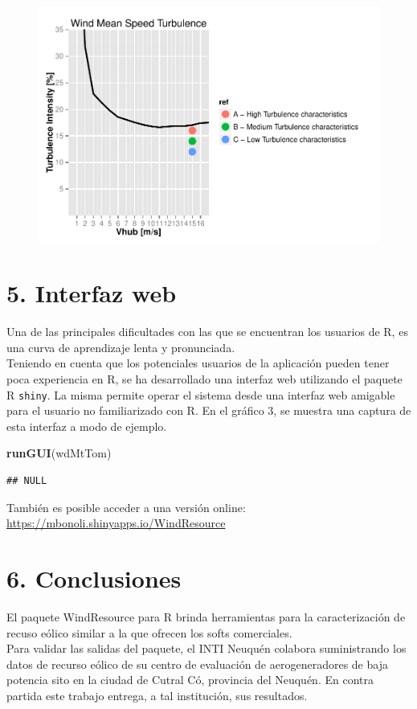 \documentclass[]{article}
\newenvironment{Shaded}{\begin{snugshade}}{\end{snugshade}}
\newcommand{\KeywordTok}[1]{\textcolor[rgb]{0.13,0.29,0.53}{\textbf{{#1}}}}
\newcommand{\NormalTok}[1]{{#1}}
\begin{document}
\begin{figure}[htbp]
\centering
\includegraphics{Manual_WindResource_files/figure-latex/unnamed-chunk-24-1.pdf}
\caption{}
\end{figure}

\section{5. Interfaz web}\label{interfaz-web}

Una de las principales dificultades con las que se encuentran los
usuarios de R, es una curva de aprendizaje lenta y
pronunciada.\\Teniendo en cuenta que los potenciales usuarios de la
aplicación pueden tener poca experiencia en R, se ha desarrollado una
interfaz web utilizando el paquete R \texttt{shiny}. La misma permite
operar el sistema desde una interfaz web amigable para el usuario no
familiarizado con R. En el gráfico 3, se muestra una captura de esta
interfaz a modo de ejemplo.

\begin{Shaded}
\begin{Highlighting}[]
\KeywordTok{runGUI}\NormalTok{(wdMtTom)}
\end{Highlighting}
\end{Shaded}

\begin{verbatim}
## NULL
\end{verbatim}

También es posible acceder a una versión online:
\url{https://mbonoli.shinyapps.io/WindResource}

\section{6. Conclusiones}\label{conclusiones}

El paquete WindResource para R brinda herramientas para la
caracterización de recuso eólico similar a la que ofrecen los softs
comerciales.\\Para validar las salidas del paquete, el INTI Neuquén
colabora suministrando los datos de recurso eólico de su centro de
evaluación de aerogeneradores de baja potencia sito en la ciudad de
Cutral Có, provincia del Neuquén. En contra partida este trabajo
entrega, a tal institución, sus resultados.
\end{document}

